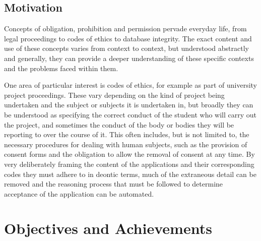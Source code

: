 \documentclass{l4proj}
\begin{document}
\subsection{Motivation}
Concepts of obligation, prohibition and permission pervade everyday life, from legal proceedings to codes of ethics to database integrity. The exact content and use of these concepts varies from context to context, but understood abstractly and generally, they can provide a deeper understanding of these specific contexts and the problems faced within them. 

One area of particular interest is codes of ethics, for example as part of university project proceedings. These vary depending on the kind of project being undertaken and the subject or subjects it is undertaken in, but broadly they can be understood as specifying the correct conduct of the student who will carry out the project, and sometimes the conduct of the body or bodies they will be reporting to over the course of it. This often includes, but is not limited to, the necessary procedures for dealing with human subjects, such as the provision of consent forms and the obligation to allow the removal of consent at any time. By very deliberately framing the content of the applications and their corresponding codes they must adhere to in deontic terms, much of the extraneous detail can be removed and the reasoning process that must be followed to determine acceptance of the application can be automated.



\section{Objectives and Achievements} %
\end{document}
